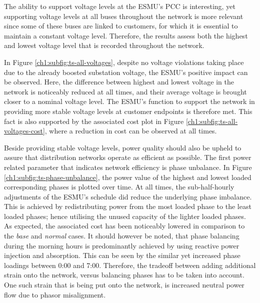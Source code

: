 The ability to support voltage levels at the ESMU's PCC is interesting, yet supporting voltage levels at all buses throughout the network is more relevant since some of these buses are linked to customers, for which it is essential to maintain a constant voltage level.
Therefore, the results assess both the highest and lowest voltage level that is recorded throughout the network.



In Figure \ref{ch1:subfig:ts-all-voltages}, despite no voltage violations taking place due to the already boosted substation voltage, the ESMU's positive impact can be observed.
Here, the difference between highest and lowest voltage in the network is noticeably reduced at all times, and their average voltage is brought closer to a nominal voltage level.
The ESMU's function to support the network in providing more stable voltage levels at customer endpoints is therefore met.
This fact is also supported by the associated cost plot in Figure \ref{ch1:subfig:ts-all-voltages-cost}, where a reduction in cost can be observed at all times.




Beside providing stable voltage levels, power quality should also be upheld to assure that distribution networks operate as efficient as possible.
The first power related parameter that indicates network efficiency is phase unbalance.
In Figure \ref{ch1:subfig:ts-phase-unbalance}, the power value of the highest and lowest loaded corresponding phases is plotted over time.
At all times, the sub-half-hourly adjustments of the ESMU's schedule did reduce the underlying phase imbalance.
This is achieved by redistributing power from the most loaded phase to the least loaded phases; hence utilising the unused capacity of the lighter loaded phases.
As expected, the associated cost has been noticeably lowered in comparison to the \textit{base} and \textit{normal} cases.
It should however be noted, that phase balancing during the morning hours is predominantly achieved by using reactive power injection and absorption.
This can be seen by the similar yet increased phase loadings between 0:00 and 7:00.
Therefore, the tradeoff between adding additional strain onto the network, versus balancing phases has to be taken into account.
One such strain that is being put onto the network, is increased neutral power flow due to phasor misalignment.



